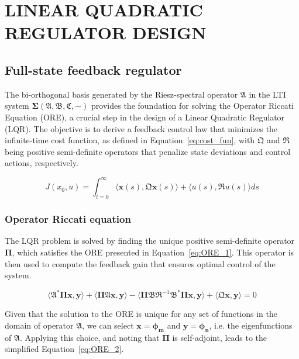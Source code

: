 \section{LINEAR QUADRATIC REGULATOR DESIGN} \label{sec:control}

\subsection{Full-state feedback regulator} \label{sec:fullstate_design}

The bi-orthogonal basis generated by the Riesz-spectral operator $\mathfrak{A}$ in the LTI system $\mathbf{\Sigma(\mathfrak{A},\mathfrak{B},\mathfrak{C},-)}$ provides the foundation for solving the Operator Riccati Equation (ORE), a crucial step in the design of a Linear Quadratic Regulator (LQR). The objective is to derive a feedback control law that minimizes the infinite-time cost function, as defined in Equation~\ref{eq:cost_fun}, with $\mathfrak{Q}$ and $\mathfrak{R}$ being positive semi-definite operators that penalize state deviations and control actions, respectively.

\begin{equation} \label{eq:cost_fun}
    J(x_0, u) = \int_{t=0}^{\infty} \langle \bm{x}(s), \mathfrak{Q} \bm{x}(s)\rangle + \langle u(s), \mathfrak{R} u(s)\rangle ds
\end{equation}

\subsubsection{Operator Riccati equation}

The LQR problem is solved by finding the unique positive semi-definite operator $\mathbf{\Pi}$, which satisfies the ORE presented in Equation~\ref{eq:ORE_1}. This operator is then used to compute the feedback gain that ensures optimal control of the system.

\begin{equation} \label{eq:ORE_1}
    \langle \mathfrak{A}^* \mathbf{\Pi} \bm{x}, \bm{y}\rangle + \langle \mathbf{\Pi} \mathfrak{A} \bm{x}, \bm{y} \rangle - \langle \mathbf{\Pi} \mathfrak{B} \mathfrak{R}^{-1} \mathfrak{B}^* \mathbf{\Pi} \bm{x}, \bm{y}\rangle + \langle \mathfrak{Q} \bm{x}, \bm{y}\rangle = 0
\end{equation}

Given that the solution to the ORE is unique for any set of functions in the domain of operator $\mathfrak{A}$, we can select $\bm{x} = \bm{\phi_m}$ and $\bm{y} = \bm{\phi_n}$, i.e. the eigenfunctions of $\mathfrak{A}$. Applying this choice, and noting that $\mathbf{\Pi}$ is self-adjoint, leads to the simplified Equation~\ref{eq:ORE_2}.

